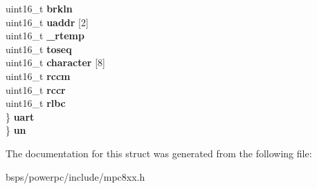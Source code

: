 \begin{DoxyCompactItemize}
\begin{tabbing}
\>\>uint16\_t {\bfseries brkln}\\
\>\>uint16\_t {\bfseries uaddr} \mbox{[}2\mbox{]}\\
\>\>uint16\_t {\bfseries \_rtemp}\\
\>\>uint16\_t {\bfseries toseq}\\
\>\>uint16\_t {\bfseries character} \mbox{[}8\mbox{]}\\
\>\>uint16\_t {\bfseries rccm}\\
\>\>uint16\_t {\bfseries rccr}\\
\>\>uint16\_t {\bfseries rlbc}\\
\>\} {\bfseries uart}\\
\} {\bfseries un}\\

\end{tabbing}\end{DoxyCompactItemize}


The documentation for this struct was generated from the following file\+:\begin{DoxyCompactItemize}
\item 
bsps/powerpc/include/mpc8xx.\+h\end{DoxyCompactItemize}
